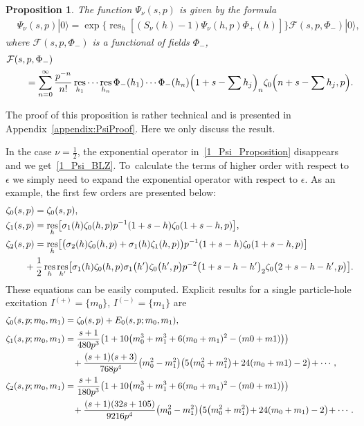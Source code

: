 \documentclass[pdftex]{sigma}
\numberwithin{equation}{section}
\newtheorem{Proposition}[Theorem]{Proposition}
 { \theoremstyle{definition}
\newtheorem{Definition}[Theorem]{Definition}
\newtheorem{Remark}[Theorem]{Remark} }
\DeclareMathOperator{\res}{res}
\begin{document}
\begin{Proposition}
\label{prop:Psi}
The function $\Psi_\nu(s, p)$ is given by the formula
\begin{align}\label{1_Psi_Proposition}
&\Psi_\nu(s, p)|0\rangle=\exp\{\res_h[(S_\nu(h)-1)\Psi_\nu(h, p)\Phi_+(h)]\} \mathcal{F}(s, p, \Phi_-)|0\rangle,
\end{align}
where $\mathcal{F}(s, p, \Phi_-)$ is a functional of fields $\Phi_{-}$,
\begin{align*}
&\mathcal{F}(s, p, \Phi_-)\\
&\qquad{}  =\sum_{n=0}^{\infty}\frac{p^{-n}}{n!}\res_{h_1}\cdots\res_{h_n} \Phi_-(h_1)\cdots\Phi_-(h_n) \Bigl(1+s-\sum h_j\Bigr)_n \zeta_0\Bigl(n+s-\sum h_j, p\Bigr).
\end{align*}
\end{Proposition}

The proof of this proposition is rather technical and is presented in Appendix~\ref{appendix:PsiProof}. Here we only discuss the result.

In the case $\nu=\frac{1}{2}$, the exponential operator in~\eqref{1_Psi_Proposition} disappears and we get~\eqref{1_Psi_BLZ}. To~calculate the terms of higher order with respect to $\epsilon$ we simply need to expand the exponential operator with respect to $\epsilon$. As an example, the first few orders are presented below:
\begin{align}\label{1_Zetas}
&\zeta_0(s, p)=\zeta_0(s, p), \\
&\zeta_1(s, p)=\res_h\bigl[\sigma_1(h)\zeta_0(h, p) p^{-1}(1+s-h) \zeta_0(1+s-h, p)\bigr], \cr
&\zeta_2(s, p)=\res_h\bigl[\bigl( \sigma_2(h)\zeta_0(h, p) + \sigma_1(h)\zeta_1(h, p) \bigr) p^{-1}(1+s-h) \zeta_0(1+s-h, p) \bigr] \cr
&              \qquad{}+\frac{1}{2}\res_h\res_{h'}\bigl[\sigma_1(h) \zeta_0(h, p)\sigma_1\bigl(h'\bigr)\zeta_0\bigl(h', p\bigr)p^{-2}\bigl(1+s-h-h'\bigr)_2\zeta_0\bigl(2+s-h-h', p\bigr)\bigr]. \nonumber
\end{align}
These equations can be easily computed. Explicit results for a single particle-hole excitation  $I^{(+)}=\{m_0\}$, $I^{(-)}=\{m_1\}$ are
\begin{align*}
&\zeta_0(s, p; m_0, m_1)=\zeta_0(s, p)+E_0(s, p; m_0, m_1), \\
%
&\zeta_1(s, p; m_0, m_1)=\frac{s+1}{480 p^3}\bigl(1+10\bigl(m_0^3+m_1^3+6(m_0+m_1)^2-(m0+m1)\bigr)\bigr) \cr
&\hphantom{\zeta_1(s, p; m_0, m_1)=}{}                \!+\frac{(s+1)(s+3)}{768 p^4}\bigl(m_0^2-m_1^2\bigr)\bigl(5\bigl(m_0^2+m_1^2\bigr)\! + 24(m_0+m1) - 2\bigr)\!+ \cdots ,\cr
%
&\zeta_2(s, p; m_0, m_1)=\frac{s+1}{180 p^3} \bigl(1+10 \bigl(m_0^3+m_1^3+6(m_0+m_1)^2-(m0+m1)\bigr) \bigr) \cr
&\hphantom{\zeta_2(s, p; m_0, m_1)=}{}                \!+\frac{(s+1)(32s+105)}{9216 p^4}\bigl(m_0^2-m_1^2\bigr)\bigl(5\bigl(m_0^2+m_1^2\bigr)\!+24(m_0+m_1)-2\bigr)\!+\cdots.
\end{align*}
\end{document}
